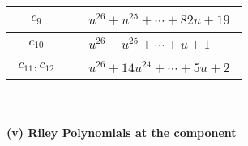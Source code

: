 \documentclass[1p]{elsarticle_modified}
\theoremstyle{definition}
\begin{document}
\begin{tabular}{m{50pt}|m{274pt}}
\hline $$\begin{aligned}c_{9}\end{aligned}$$&$\begin{aligned}
&u^{26}+u^{25}+\cdots+82 u+19
\end{aligned}$\\
\hline $$\begin{aligned}c_{10}\end{aligned}$$&$\begin{aligned}
&u^{26}- u^{25}+\cdots+u+1
\end{aligned}$\\
\hline $$\begin{aligned}c_{11},c_{12}\end{aligned}$$&$\begin{aligned}
&u^{26}+14 u^{24}+\cdots+5 u+2
\end{aligned}$\\
\hline
\end{tabular}\\~\\
\newpage\renewcommand{\arraystretch}{1}
\flushleft \textbf{(v) Riley Polynomials at the component}\newline \\
\end{document}
